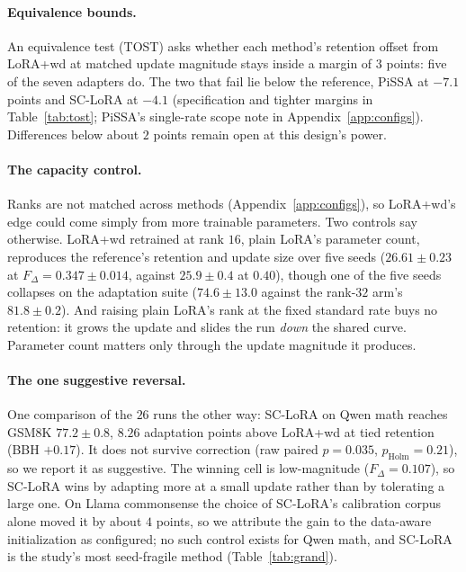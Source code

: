 \documentclass[11pt]{article}
\newcommand{\dw}{F_{\Delta}}
\begin{document}
\paragraph{Equivalence bounds.} An equivalence test (TOST) asks whether each
method's retention offset from LoRA{+}wd at matched update magnitude stays
inside a margin of $3$ points: five of the seven adapters do. The two that
fail lie below the reference, PiSSA at $-7.1$ points and SC-LoRA at $-4.1$
(specification and tighter margins in Table~\ref{tab:tost}; PiSSA's
single-rate scope note in Appendix~\ref{app:configs}). Differences below
about $2$ points remain open at this design's power.

\paragraph{The capacity control.} Ranks are not matched across methods
(Appendix~\ref{app:configs}), so LoRA{+}wd's edge could come simply from more
trainable parameters. Two controls say otherwise. LoRA{+}wd retrained at
rank $16$, plain LoRA's parameter count, reproduces the reference's
retention and update size over five seeds ($26.61\!\pm\!0.23$ at
$\dw\!=\!0.347\!\pm\!0.014$, against $25.9\!\pm\!0.4$ at $0.40$), though one
of the five seeds collapses on the adaptation suite ($74.6\!\pm\!13.0$
against the rank-$32$ arm's $81.8\!\pm\!0.2$). And raising plain LoRA's rank
at the fixed standard rate buys no retention: it grows the update and slides
the run \emph{down} the shared curve. Parameter count matters only through
the update magnitude it produces.

\paragraph{The one suggestive reversal.} One comparison of the $26$ runs
the other way: SC-LoRA on Qwen math reaches GSM8K $77.2\!\pm\!0.8$, $8.26$
adaptation points above LoRA{+}wd at tied retention (BBH $+0.17$). It does
not survive correction (raw paired $p\!=\!0.035$,
$p_{\text{Holm}}\!=\!0.21$), so we report it as suggestive. The winning cell
is low-magnitude ($\dw\!=\!0.107$), so SC-LoRA wins by adapting more at a
small update rather than by tolerating a large one. On Llama commonsense the
choice of SC-LoRA's calibration corpus alone moved it by about $4$ points,
so we attribute the gain to the data-aware initialization as configured; no
such control exists for Qwen math, and SC-LoRA is the study's most
seed-fragile method (Table~\ref{tab:grand}).
\end{document}
